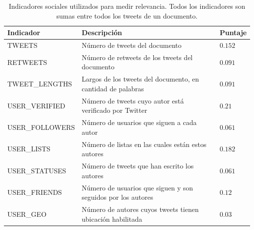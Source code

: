 \begin{table}[htb]
\begin{center}
\begin{tabular}{|l|l|l|}
\hline
 Indicador        &  Descripción                                                   &  Puntaje  \\
\hline
\hline
 TWEETS           &  Número de tweets del documento                                &  $0.152$  \\
 RETWEETS         &  Número de retweets de los tweets del documento                &  $0.091$  \\
 TWEET\_LENGTHS   &  Largos de los tweets del documento, en cantidad de palabras   &  $0.091$  \\
 USER\_VERIFIED   &  Número de tweets cuyo autor está verificado por Twitter       &  $0.21$   \\
 USER\_FOLLOWERS  &  Número de usuarios que siguen a cada autor                    &  $0.061$  \\
 USER\_LISTS      &  Número de listas en las cuales están estos autores            &  $0.182$  \\
 USER\_STATUSES   &  Número de tweets que han escrito los autores                  &  $0.061$  \\
 USER\_FRIENDS    &  Número de usuarios que siguen y son seguidos por los autores  &  $0.12$   \\
 USER\_GEO        &  Número de autores cuyos tweets tienen ubicación habilitada    &  $0.03$   \\
\hline
\end{tabular}
\end{center}
\caption{\label{tbl:indicadores}Indicadores sociales utilizados para medir relevancia. Todos los indicadores son sumas entre todos los tweets de un documento.}
\end{table}

